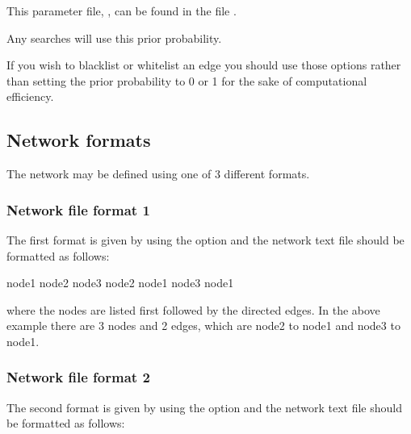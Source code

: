 \documentclass[letterpaper,10pt,english]{sphinxmanual}
\begin{document}
\sphinxAtStartPar
This parameter file, , can be found in the file .

\sphinxAtStartPar
Any searches will use this prior probability.

\sphinxAtStartPar
If you wish to blacklist or whitelist an edge you should use those options rather than setting the prior probability to 0 or 1 for the sake of computational efficiency.


\subsection{Network formats}
\label{\detokenize{input-network:network-formats}}\label{\detokenize{input-network:input-network-formats}}
\sphinxAtStartPar
The network may be defined using one of 3 different formats.


\subsubsection{Network file format 1}
\label{\detokenize{input-network:network-file-format-1}}\label{\detokenize{input-network:input-network-formats-format1}}
\sphinxAtStartPar
The first format is given by using the  option and the network text file should be formatted as follows:

\begin{sphinxVerbatim}[commandchars=\\\{\}]
node1
node2
node3
node2 node1
node3 node1
\end{sphinxVerbatim}

\sphinxAtStartPar
where the nodes are listed first followed by the directed edges. In the above example there are 3 nodes and 2 edges, which are node2 to node1 and node3 to node1.


\subsubsection{Network file format 2}
\label{\detokenize{input-network:network-file-format-2}}\label{\detokenize{input-network:input-network-formats-format2}}
\sphinxAtStartPar
The second format is given by using the  option and the network text file should be formatted as follows:
\end{document}
